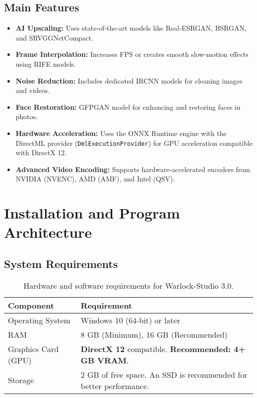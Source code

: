 \documentclass[11pt, a4paper]{article}
\begin{document}
\subsection{Main Features}
\begin{itemize}[leftmargin=*]
    \item \textbf{AI Upscaling:} Uses state-of-the-art models like Real-ESRGAN, BSRGAN, and SRVGGNetCompact.
    \item \textbf{Frame Interpolation:} Increases FPS or creates smooth slow-motion effects using RIFE models.
    \item \textbf{Noise Reduction:} Includes dedicated IRCNN models for cleaning images and videos.
    \item \textbf{Face Restoration:} GFPGAN model for enhancing and restoring faces in photos.
    \item \textbf{Hardware Acceleration:} Uses the ONNX Runtime engine with the DirectML provider (\texttt{DmlExecutionProvider}) for GPU acceleration compatible with DirectX 12.
    \item \textbf{Advanced Video Encoding:} Supports hardware-accelerated encoders from NVIDIA (NVENC), AMD (AMF), and Intel (QSV).
\end{itemize}


\section{Installation and Program Architecture}

\subsection{System Requirements}
\begin{table}[H]
    \centering %
    \begin{tabular}{ll}
        \toprule %
        \textbf{Component} & \textbf{Requirement} \\
        \midrule %
        Operating System & Windows 10 (64-bit) or later \\
        RAM & 8 GB (Minimum), 16 GB (Recommended) \\
        Graphics Card (GPU) & \textbf{DirectX 12} compatible. \textbf{Recommended: 4+ GB VRAM}. \\
        Storage & 2 GB of free space. An SSD is recommended for better performance. \\
        \bottomrule %
    \end{tabular}
    \caption{Hardware and software requirements for Warlock-Studio 3.0.}
\end{table}
\end{document}
